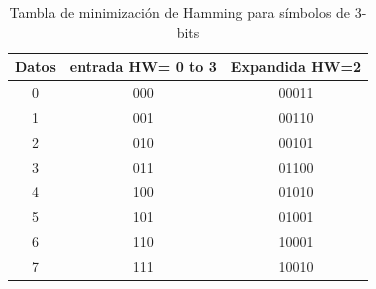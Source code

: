 \begin{table}[t]
\begin{center}
\begin{tabular}{c c c}
Datos & entrada HW= 0 to 3 & Expandida HW=2\\
\hline\hline
0 & 000 & 00011\\
1 & 001 & 00110\\
2 & 010 & 00101\\
3 & 011 & 01100\\
4 & 100 & 01010\\
5 & 101 & 01001\\
6 & 110 & 10001\\
7 & 111 & 10010\\
\end{tabular}
\caption{Tambla de minimización de Hamming para símbolos de 3-bits}
\label{hwtable}
\end{center}
 \end{table}
 
